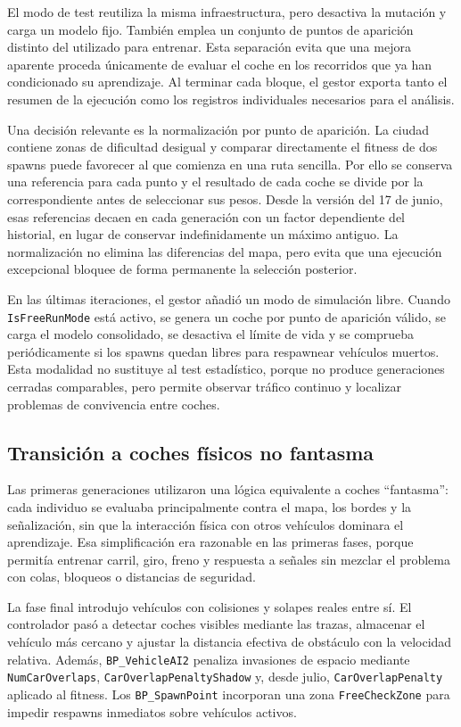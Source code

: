 El modo de test reutiliza la misma infraestructura, pero desactiva la mutación y carga un modelo fijo. También emplea un conjunto de puntos de aparición distinto del utilizado para entrenar. Esta separación evita que una mejora aparente proceda únicamente de evaluar el coche en los recorridos que ya han condicionado su aprendizaje. Al terminar cada bloque, el gestor exporta tanto el resumen de la ejecución como los registros individuales necesarios para el análisis.

Una decisión relevante es la normalización por punto de aparición. La ciudad contiene zonas de dificultad desigual y comparar directamente el fitness de dos spawns puede favorecer al que comienza en una ruta sencilla. Por ello se conserva una referencia para cada punto y el resultado de cada coche se divide por la correspondiente antes de seleccionar sus pesos. Desde la versión del 17 de junio, esas referencias decaen en cada generación con un factor dependiente del historial, en lugar de conservar indefinidamente un máximo antiguo. La normalización no elimina las diferencias del mapa, pero evita que una ejecución excepcional bloquee de forma permanente la selección posterior.

En las últimas iteraciones, el gestor añadió un modo de simulación libre. Cuando \texttt{IsFreeRunMode} está activo, se genera un coche por punto de aparición válido, se carga el modelo consolidado, se desactiva el límite de vida y se comprueba periódicamente si los spawns quedan libres para respawnear vehículos muertos. Esta modalidad no sustituye al test estadístico, porque no produce generaciones cerradas comparables, pero permite observar tráfico continuo y localizar problemas de convivencia entre coches.

\subsection{Transición a coches físicos no fantasma}

Las primeras generaciones utilizaron una lógica equivalente a coches ``fantasma'': cada individuo se evaluaba principalmente contra el mapa, los bordes y la señalización, sin que la interacción física con otros vehículos dominara el aprendizaje. Esa simplificación era razonable en las primeras fases, porque permitía entrenar carril, giro, freno y respuesta a señales sin mezclar el problema con colas, bloqueos o distancias de seguridad.

La fase final introdujo vehículos con colisiones y solapes reales entre sí. El controlador pasó a detectar coches visibles mediante las trazas, almacenar el vehículo más cercano y ajustar la distancia efectiva de obstáculo con la velocidad relativa. Además, \texttt{BP\_VehicleAI2} penaliza invasiones de espacio mediante \texttt{NumCarOverlaps}, \texttt{CarOverlapPenaltyShadow} y, desde julio, \texttt{CarOverlapPenalty} aplicado al fitness. Los \texttt{BP\_SpawnPoint} incorporan una zona \texttt{FreeCheckZone} para impedir respawns inmediatos sobre vehículos activos.

